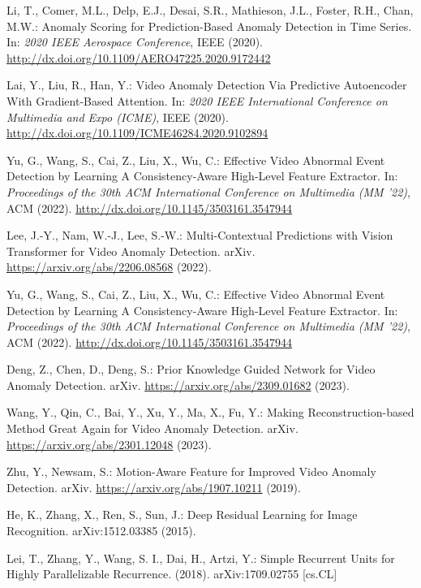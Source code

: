 \documentclass[runningheads]{llncs}
\begin{document}
\begin{thebibliography}{99}
Li, T., Comer, M.L., Delp, E.J., Desai, S.R., Mathieson, J.L., Foster, R.H., Chan, M.W.: Anomaly Scoring for Prediction-Based Anomaly Detection in Time Series. In: \textit{2020 IEEE Aerospace Conference}, IEEE (2020). \url{http://dx.doi.org/10.1109/AERO47225.2020.9172442}

Lai, Y., Liu, R., Han, Y.: Video Anomaly Detection Via Predictive Autoencoder With Gradient-Based Attention. In: \textit{2020 IEEE International Conference on Multimedia and Expo (ICME)}, IEEE (2020). \url{http://dx.doi.org/10.1109/ICME46284.2020.9102894}

Yu, G., Wang, S., Cai, Z., Liu, X., Wu, C.: Effective Video Abnormal Event Detection by Learning A Consistency-Aware High-Level Feature Extractor. In: \textit{Proceedings of the 30th ACM International Conference on Multimedia (MM '22)}, ACM (2022). \url{http://dx.doi.org/10.1145/3503161.3547944}

Lee, J.-Y., Nam, W.-J., Lee, S.-W.: Multi-Contextual Predictions with Vision Transformer for Video Anomaly Detection. arXiv. \url{https://arxiv.org/abs/2206.08568} (2022). 

Yu, G., Wang, S., Cai, Z., Liu, X., Wu, C.: Effective Video Abnormal Event Detection by Learning A Consistency-Aware High-Level Feature Extractor. In: \textit{Proceedings of the 30th ACM International Conference on Multimedia (MM '22)}, ACM (2022). \url{http://dx.doi.org/10.1145/3503161.3547944}

Deng, Z., Chen, D., Deng, S.: Prior Knowledge Guided Network for Video Anomaly Detection. arXiv. \url{https://arxiv.org/abs/2309.01682} (2023). 

Wang, Y., Qin, C., Bai, Y., Xu, Y., Ma, X., Fu, Y.: Making Reconstruction-based Method Great Again for Video Anomaly Detection. arXiv. \url{https://arxiv.org/abs/2301.12048} (2023). 

Zhu, Y., Newsam, S.: Motion-Aware Feature for Improved Video Anomaly Detection. arXiv. \url{https://arxiv.org/abs/1907.10211} (2019). 

He, K., Zhang, X., Ren, S., Sun, J.: Deep Residual Learning for Image Recognition. arXiv:1512.03385 (2015).

Lei, T., Zhang, Y., Wang, S. I., Dai, H., Artzi, Y.: Simple Recurrent Units for Highly Parallelizable Recurrence. (2018). arXiv:1709.02755 [cs.CL]


\end{thebibliography}
\end{document}
